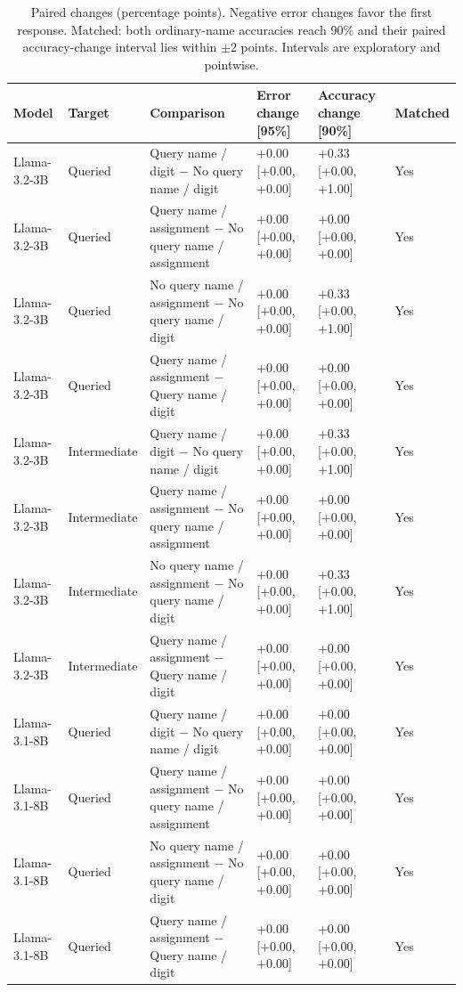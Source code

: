 \begin{table}[t]
\centering\small\setlength{\tabcolsep}{3pt}
\begin{tabular}{@{}p{}p{}p{}p{}p{}p{}@{}}
\toprule
Model & Target & Comparison & Error change [95\%] & Accuracy change [90\%] & Matched \\
\midrule
Llama-3.2-3B & Queried & Query name / digit $-$ No query name / digit & +0.00 [+0.00, +0.00] & +0.33 [+0.00, +1.00] & Yes \\
Llama-3.2-3B & Queried & Query name / assignment $-$ No query name / assignment & +0.00 [+0.00, +0.00] & +0.00 [+0.00, +0.00] & Yes \\
Llama-3.2-3B & Queried & No query name / assignment $-$ No query name / digit & +0.00 [+0.00, +0.00] & +0.33 [+0.00, +1.00] & Yes \\
Llama-3.2-3B & Queried & Query name / assignment $-$ Query name / digit & +0.00 [+0.00, +0.00] & +0.00 [+0.00, +0.00] & Yes \\
Llama-3.2-3B & Intermediate & Query name / digit $-$ No query name / digit & +0.00 [+0.00, +0.00] & +0.33 [+0.00, +1.00] & Yes \\
Llama-3.2-3B & Intermediate & Query name / assignment $-$ No query name / assignment & +0.00 [+0.00, +0.00] & +0.00 [+0.00, +0.00] & Yes \\
Llama-3.2-3B & Intermediate & No query name / assignment $-$ No query name / digit & +0.00 [+0.00, +0.00] & +0.33 [+0.00, +1.00] & Yes \\
Llama-3.2-3B & Intermediate & Query name / assignment $-$ Query name / digit & +0.00 [+0.00, +0.00] & +0.00 [+0.00, +0.00] & Yes \\
Llama-3.1-8B & Queried & Query name / digit $-$ No query name / digit & +0.00 [+0.00, +0.00] & +0.00 [+0.00, +0.00] & Yes \\
Llama-3.1-8B & Queried & Query name / assignment $-$ No query name / assignment & +0.00 [+0.00, +0.00] & +0.00 [+0.00, +0.00] & Yes \\
Llama-3.1-8B & Queried & No query name / assignment $-$ No query name / digit & +0.00 [+0.00, +0.00] & +0.00 [+0.00, +0.00] & Yes \\
Llama-3.1-8B & Queried & Query name / assignment $-$ Query name / digit & +0.00 [+0.00, +0.00] & +0.00 [+0.00, +0.00] & Yes \\
\bottomrule
\end{tabular}
\caption{Paired changes (percentage points). Negative error changes favor the first response. Matched: both ordinary-name accuracies reach 90\% and their paired accuracy-change interval lies within $\pm2$ points. Intervals are exploratory and pointwise.}
\label{tab:r7-final_query-contrasts-1}
\end{table}

